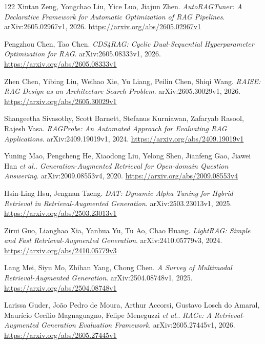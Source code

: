 \documentclass[11pt,a4paper]{article}
\begin{document}
\begin{thebibliography}{122}
Xintan Zeng, Yongchao Liu, Yice Luo, Jiajun Zhen.
\newblock \emph{AutoRAGTuner: A Declarative Framework for Automatic Optimization of RAG Pipelines}.
\newblock arXiv:2605.02967v1, 2026.
\newblock \url{https://arxiv.org/abs/2605.02967v1}

Pengzhou Chen, Tao Chen.
\newblock \emph{CDS4RAG: Cyclic Dual-Sequential Hyperparameter Optimization for RAG}.
\newblock arXiv:2605.08333v1, 2026.
\newblock \url{https://arxiv.org/abs/2605.08333v1}

Zhen Chen, Yibing Liu, Weihao Xie, Yu Liang, Peilin Chen, Shiqi Wang.
\newblock \emph{RAISE: RAG Design as an Architecture Search Problem}.
\newblock arXiv:2605.30029v1, 2026.
\newblock \url{https://arxiv.org/abs/2605.30029v1}

Shangeetha Sivasothy, Scott Barnett, Stefanus Kurniawan, Zafaryab Rasool, Rajesh Vasa.
\newblock \emph{RAGProbe: An Automated Approach for Evaluating RAG Applications}.
\newblock arXiv:2409.19019v1, 2024.
\newblock \url{https://arxiv.org/abs/2409.19019v1}

Yuning Mao, Pengcheng He, Xiaodong Liu, Yelong Shen, Jianfeng Gao, Jiawei Han \emph{et al.}.
\newblock \emph{Generation-Augmented Retrieval for Open-domain Question Answering}.
\newblock arXiv:2009.08553v4, 2020.
\newblock \url{https://arxiv.org/abs/2009.08553v4}

Hsin-Ling Hsu, Jengnan Tzeng.
\newblock \emph{DAT: Dynamic Alpha Tuning for Hybrid Retrieval in Retrieval-Augmented Generation}.
\newblock arXiv:2503.23013v1, 2025.
\newblock \url{https://arxiv.org/abs/2503.23013v1}

Zirui Guo, Lianghao Xia, Yanhua Yu, Tu Ao, Chao Huang.
\newblock \emph{LightRAG: Simple and Fast Retrieval-Augmented Generation}.
\newblock arXiv:2410.05779v3, 2024.
\newblock \url{https://arxiv.org/abs/2410.05779v3}

Lang Mei, Siyu Mo, Zhihan Yang, Chong Chen.
\newblock \emph{A Survey of Multimodal Retrieval-Augmented Generation}.
\newblock arXiv:2504.08748v1, 2025.
\newblock \url{https://arxiv.org/abs/2504.08748v1}

Larissa Guder, Jo\~{a}o Pedro de Moura, Arthur Accorsi, Gustavo Losch do Amaral, Maur\'{i}cio Cec\'{i}lio Magnaguagno, Felipe Meneguzzi \emph{et al.}.
\newblock \emph{RAGe: A Retrieval-Augmented Generation Evaluation Framework}.
\newblock arXiv:2605.27445v1, 2026.
\newblock \url{https://arxiv.org/abs/2605.27445v1}


\end{thebibliography}
\end{document}
